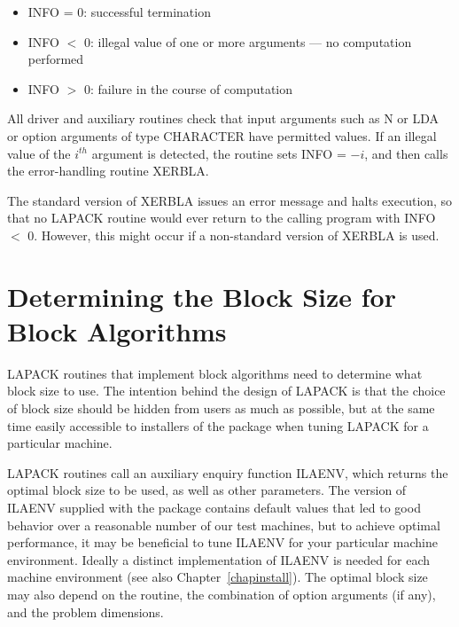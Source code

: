 \begin{itemize}
\item INFO = 0: successful termination

\item INFO $<$ 0: illegal value of one or more arguments --- no computation
performed

\item INFO $>$ 0: failure in the course of computation
\end{itemize}

All driver and auxiliary routines
check that input arguments such as N or LDA or
option arguments of type CHARACTER
have permitted values.
If an illegal value of the $i^{th}$ argument is detected, the routine
sets INFO = $-i$, and then calls the error-handling routine XERBLA.

The standard version of XERBLA issues an error message and halts execution,
so that no LAPACK routine would ever return to the calling program with
INFO $<$ 0. However, this might occur if a non-standard version of XERBLA
is used.

\section{Determining the Block Size for Block Algorithms}\label{secblocksize}

LAPACK routines that implement block algorithms need to determine
what block size to use.
The intention behind the design of LAPACK is that the choice of block size
should be hidden from users as much as possible, but at the same time
easily accessible to installers of the package 
when tuning LAPACK for a particular machine.

LAPACK routines call an auxiliary enquiry function ILAENV, which returns
the optimal block size to be used, as well as other parameters.
The version of ILAENV supplied with the 
package contains
default values that led to good behavior over a reasonable
number of our test machines, but to achieve optimal 
performance, it may be beneficial to 
tune ILAENV for your
particular machine environment.
Ideally a distinct implementation of ILAENV is needed for each
machine environment (see also Chapter~\ref{chapinstall}).
The optimal block size may also depend on the routine, the combination of
option arguments (if any), and the problem dimensions. 

